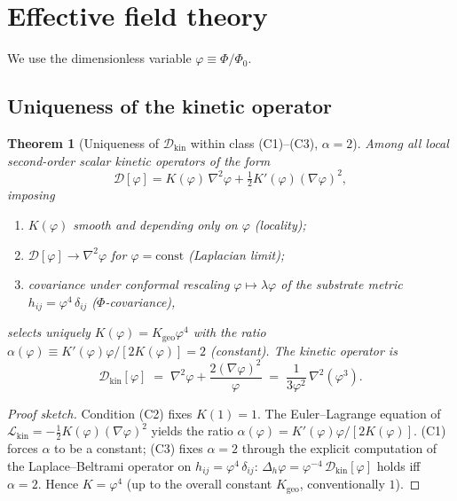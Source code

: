 \documentclass[11pt,a4paper]{article}
\renewcommand{\Phi}{\varPhi}
\newcommand{\PhiZero}{\varPhi_{0}}
\newcommand{\DD}{\mathcal{D}}
\newtheorem{theorem}[axiom]{Theorem}
\begin{document}
\section{Effective field theory}\label{sec:field}

We use the dimensionless variable $\varphi \equiv \Phi/\PhiZero$.

\subsection{Uniqueness of the kinetic operator}

\begin{theorem}[Uniqueness of $\DD_{\mathrm{kin}}$ within class (C1)--(C3), $\alpha=2$]\label{thm:alpha2}
Among all local second-order scalar kinetic operators of the form
\begin{equation}
  \DD[\varphi]
  = K(\varphi)\,\nabla^{2}\varphi
  + \tfrac{1}{2}K'(\varphi)(\nabla\varphi)^{2},
\end{equation}
imposing
\begin{enumerate}[(C1),nosep]
  \item $K(\varphi)$ smooth and depending only on $\varphi$ (locality);
  \item $\DD[\varphi]\to\nabla^{2}\varphi$ for $\varphi=\mathrm{const}$
    (Laplacian limit);
  \item covariance under conformal rescaling $\varphi\mapsto\lambda\varphi$
    of the substrate metric $h_{ij}=\varphi^{4}\,\delta_{ij}$
    ($\Phi$-covariance),
\end{enumerate}
selects uniquely $K(\varphi)=K_{\mathrm{geo}}\varphi^{4}$ with the
ratio $\alpha(\varphi)\equiv K'(\varphi)\varphi/[2K(\varphi)]=2$ (constant).
The kinetic operator is
\begin{equation}\label{eq:Dkin}
  \boxed{\;
    \DD_{\mathrm{kin}}[\varphi]
    \;=\;\nabla^{2}\varphi+\frac{2(\nabla\varphi)^{2}}{\varphi}
    \;=\;\frac{1}{3\varphi^{2}}\,\nabla^{2}(\varphi^{3}).
  \;}
\end{equation}
\end{theorem}

\begin{proof}[Proof sketch]
Condition (C2) fixes $K(1)=1$. The Euler--Lagrange equation of
$\mathcal{L}_{\mathrm{kin}}=-\tfrac{1}{2}K(\varphi)(\nabla\varphi)^{2}$
yields the ratio $\alpha(\varphi)=K'(\varphi)\varphi/[2K(\varphi)]$.
(C1) forces $\alpha$ to be a constant; (C3) fixes $\alpha=2$ through the
explicit computation of the Laplace--Beltrami operator on
$h_{ij}=\varphi^{4}\,\delta_{ij}$:
$\Delta_{h}\varphi=\varphi^{-4}\,\DD_{\mathrm{kin}}[\varphi]$ holds
iff $\alpha=2$. Hence $K=\varphi^{4}$ (up to the overall constant
$K_{\mathrm{geo}}$, conventionally $1$).
\end{proof}
\end{document}
